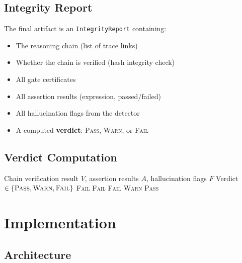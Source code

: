 \documentclass[11pt,a4paper]{article}
\begin{document}
\subsection{Integrity Report}

The final artifact is an \texttt{IntegrityReport} containing:
\begin{itemize}[leftmargin=2em]
  \item The reasoning chain (list of trace links)
  \item Whether the chain is verified (hash integrity check)
  \item All gate certificates
  \item All assertion results (expression, passed/failed)
  \item All hallucination flags from the detector
  \item A computed \textbf{verdict}: \textsc{Pass}, \textsc{Warn}, or \textsc{Fail}
\end{itemize}

\subsection{Verdict Computation}

\begin{algorithm}[H]
\caption{Integrity verdict computation.}
\label{alg:verdict}
\begin{algorithmic}[1]
\Require Chain verification result $V$, assertion results $A$, hallucination flags $F$
\Ensure Verdict $\in \{\textsc{Pass}, \textsc{Warn}, \textsc{Fail}\}$
  \State \Return \textsc{Fail} 
\EndIf
{}
  \State \Return \textsc{Fail} 
\EndIf
{}
  \State \Return \textsc{Fail} 
\EndIf
{}
  \State \Return \textsc{Warn} 
\EndIf
\State \Return \textsc{Pass}
\end{algorithmic}
\end{algorithm}

\section{Implementation}
\label{sec:implementation}

\subsection{Architecture}
\end{document}
